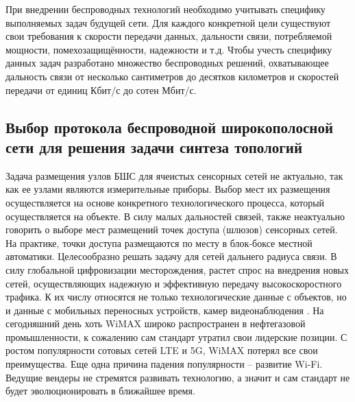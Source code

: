 






При внедрении беспроводных технологий необходимо учитывать специфику выполняемых задач будущей сети. Для каждого конкретной цели существуют свои требования к скорости передачи данных, дальности связи, потребляемой мощности, помехозащищённости, надежности и т.д. Чтобы учесть специфику данных задач разработано множество беспроводных решений, охватывающее дальность связи от несколько сантиметров до десятков километров и скоростей передачи от единиц Кбит/с до сотен Мбит/с.

\subsection{Выбор протокола беспроводной широкополосной сети для решения задачи синтеза топологий}

Задача размещения узлов БШС для ячеистых сенсорных сетей не актуально, так как ее узлами являются измерительные приборы. Выбор мест их размещения осуществляется на основе конкретного технологического процесса, который осуществляется на объекте. В силу малых дальностей связей, также неактуально говорить о выборе мест размещений точек доступа (шлюзов) сенсорных сетей. На практике, точки доступа размещаются по месту в блок-боксе местной автоматики. Целесообразно решать задачу для сетей дальнего радиуса связи. В силу глобальной цифровизации месторождения, растет спрос на внедрения новых сетей, осуществляющих надежную и эффективную передачу высокоскоростного трафика. К их числу относятся не только технологические данные с объектов, но и данные с мобильных переносных устройств, камер видеонаблюдения . На сегодняшний день хоть WiMAX широко распространен в нефтегазовой промышленности, к сожалению сам стандарт утратил свои лидерские позиции. С ростом популярности сотовых сетей LTE и 5G, WiMAX потерял все свои преимущества. Еще одна причина падения популярности -- развитие Wi-Fi. Ведущие вендеры не стремятся развивать технологию, а значит и сам стандарт не будет эволюционировать в ближайшее время. 

